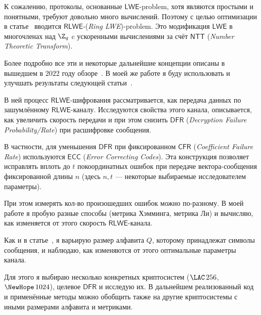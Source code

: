 К сожалению, протоколы, основанные $\mathsf{LWE}$-problem, хотя являются простыми и понятными, требуют довольно много вычислений. Поэтому с целью оптимизации в статье~\cite{RLWE} вводится $\mathsf{RLWE}$-({\it Ring LWE})-problem. Это модификация $\mathsf{LWE}$ в многочленах над $\Z_q$ c ускоренными вычислениями за счёт $\mathsf{NTT}$ ({\it Number Theoretic Transform}).

Более подробно все эти и некоторые дальнейшие концепции описаны в вышедшем в $2022$ году обзоре~\cite{Li2022ATI}. В моей же работе я буду использовать и улучшать результаты следующей статьи~\cite{RLWE_Channel}.

В ней процесс $\mathsf{RLWE}$-шифрования рассматривается, как передача данных по зашумлённому $\mathsf{RLWE}$-каналу. Исследуются свойства этого канала, описывается, как увеличить скорость передачи и при этом снизить $\mathsf{DFR}$ ({\it Decryption Failure Probability/Rate}) при расшифровке сообщения.

В частности, для уменьшения $\mathsf{DFR}$ при фиксированном $\mathsf{CFR}$ ({\it Coefficient Failure Rate}) используются $\mathsf{ECC}$ ({\it Error Correcting Codes}). Эта конструкция позволяет исправлять вплоть до $t$ покоординатных ошибок при передаче вектора-сообщения фиксированной длины $n$ (здесь $n, t$ --- некоторые выбираемые исследователем параметры).

При этом измерять кол-во произошедших ошибок можно по-разному. В моей работе я пробую разные способы (метрика Хэмминга, метрика Ли) и вычисляю, как изменяется от этого скорость $\mathsf{RLWE}$-канала.

Как и в статье~\cite{RLWE_Channel}, я варьирую размер алфавита $Q$, которому принадлежат символы сообщения, и наблюдаю, как изменяются от этого оптимальные параметры канала.

Для этого я выбираю несколько конкретных криптосистем ($\LAC\,256$, $\NewHope\,1024$), целевое $\mathsf{DFR}$ и исследую их. В дальнейшем реализованный код и применённые методы можно обобщить также на другие криптосистемы с иными размерами алфавита и метриками.
